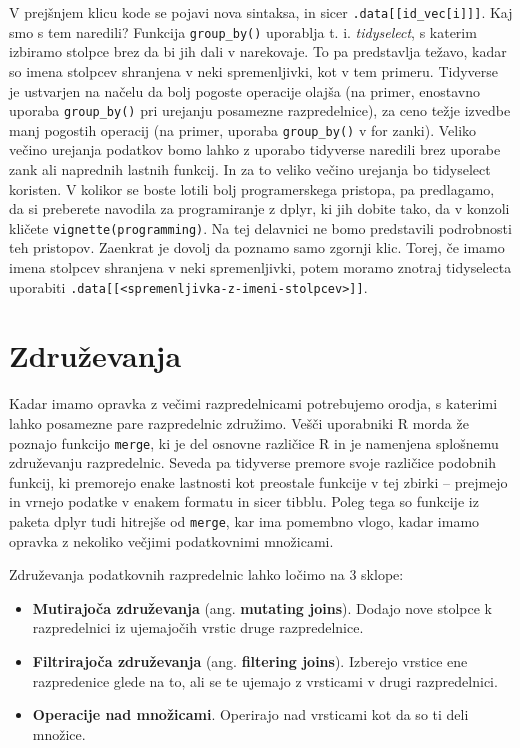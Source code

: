 \documentclass[
]{book}
\providecommand{\tightlist}{%
  \setlength{\itemsep}{0pt}\setlength{\parskip}{0pt}}
\begin{document}
V prejšnjem klicu kode se pojavi nova sintaksa, in sicer \texttt{.data{[}{[}id\_vec{[}i{]}{]}{]}}. Kaj smo s tem naredili? Funkcija \texttt{group\_by()} uporablja t. i. \emph{tidyselect}, s katerim izbiramo stolpce brez da bi jih dali v narekovaje. To pa predstavlja težavo, kadar so imena stolpcev shranjena v neki spremenljivki, kot v tem primeru. Tidyverse je ustvarjen na načelu da bolj pogoste operacije olajša (na primer, enostavno uporaba \texttt{group\_by()} pri urejanju posamezne razpredelnice), za ceno težje izvedbe manj pogostih operacij (na primer, uporaba \texttt{group\_by()} v for zanki). Veliko večino urejanja podatkov bomo lahko z uporabo tidyverse naredili brez uporabe zank ali naprednih lastnih funkcij. In za to veliko večino urejanja bo tidyselect koristen. V kolikor se boste lotili bolj programerskega pristopa, pa predlagamo, da si preberete navodila za programiranje z dplyr, ki jih dobite tako, da v konzoli kličete \texttt{vignette(\textquotesingle{}programming\textquotesingle{})}. Na tej delavnici ne bomo predstavili podrobnosti teh pristopov. Zaenkrat je dovolj da poznamo samo zgornji klic. Torej, če imamo imena stolpcev shranjena v neki spremenljivki, potem moramo znotraj tidyselecta uporabiti \texttt{.data{[}{[}\textless{}spremenljivka-z-imeni-stolpcev\textgreater{}{]}{]}}.

\hypertarget{zdruux17eevanja}{%
\section{Združevanja}\label{zdruux17eevanja}}

Kadar imamo opravka z večimi razpredelnicami potrebujemo orodja, s katerimi lahko posamezne pare razpredelnic združimo. Vešči uporabniki R morda že poznajo funkcijo \texttt{merge}, ki je del osnovne različice R in je namenjena splošnemu združevanju razpredelnic. Seveda pa tidyverse premore svoje različice podobnih funkcij, ki premorejo enake lastnosti kot preostale funkcije v tej zbirki -- prejmejo in vrnejo podatke v enakem formatu in sicer tibblu. Poleg tega so funkcije iz paketa dplyr tudi hitrejše od \texttt{merge}, kar ima pomembno vlogo, kadar imamo opravka z nekoliko večjimi podatkovnimi množicami.

Združevanja podatkovnih razpredelnic lahko ločimo na 3 sklope:

\begin{itemize}
\tightlist
\item
  \textbf{Mutirajoča združevanja} (ang. \textbf{mutating joins}). Dodajo nove stolpce k razpredelnici iz ujemajočih vrstic druge razpredelnice.
\item
  \textbf{Filtrirajoča združevanja} (ang. \textbf{filtering joins}). Izberejo vrstice ene razpredenice glede na to, ali se te ujemajo z vrsticami v drugi razpredelnici.
\item
  \textbf{Operacije nad množicami}. Operirajo nad vrsticami kot da so ti deli množice.
\end{itemize}
\end{document}
